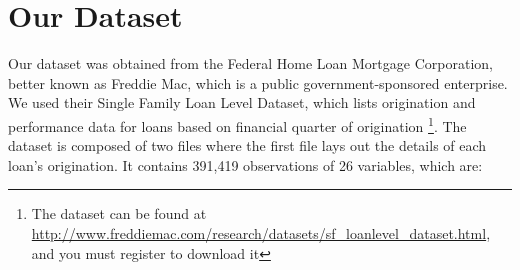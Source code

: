 \documentclass[12 pt]{uncw_thesis}
\theoremstyle{plain}
\theoremstyle{remark}
\theoremstyle{definition}
\begin{document}


\section{Our Dataset}
Our dataset was obtained from the Federal Home Loan Mortgage Corporation, better known as Freddie Mac, which is a public government-sponsored enterprise. We used their Single Family Loan Level Dataset, which lists origination and performance data for loans based on financial quarter of origination \footnote{The dataset can be found at \href{ http://www.freddiemac.com/research/datasets/sf\_loanlevel\_dataset.html}{http://www.freddiemac.com/research/datasets/sf\_loanlevel\_dataset.html}, and you must register to download it}. The dataset is composed of two files where the first file lays out the details of each loan's origination. It contains 391,419 observations of 26 variables, which are: 
\end{document}
